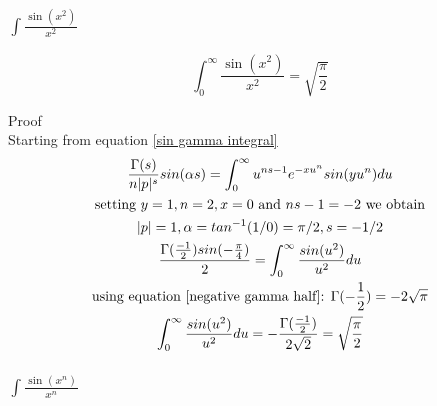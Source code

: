 \documentclass[a4paper]{article}
\begin{document}
\subsubsection{$\int \frac{\sin(x^2)}{x^2}$}

\begin{theorem}
\begin{equation}
\boxed{
\int_{0}^{\infty} \frac{\sin(x^2)}{x^2} = \sqrt{\frac{\pi}{2}}
}
\end{equation}

Proof
\\
Starting from equation \ref{sin gamma integral}
\begin{gather*}
\frac{\Gamma(s)}{n |p|^s} sin(\alpha s)= \int_{0}^{\infty} u^{ns -1} e^{-x u^{n}} sin(y u^n) du
\\
\text{setting $y=1, n=2, x=0$ and $ns -1 = -2$ we obtain}
\\
|p| = 1, \alpha = tan^{-1}(1/0) = \pi/2, s = -1/2
\\
\frac{\Gamma(\frac{-1}{2}) sin(-\frac{\pi}{4})}{2} = \int_{0}^{\infty} \frac{sin(u^2)}{u^2} du
\\
\text{using equation \ref{negative gamma half}: } \Gamma(-\frac{1}{2}) = -2\sqrt{\pi}
\\
\int_{0}^{\infty} \frac{sin(u^2)}{u^2} du = -\frac{\Gamma(\frac{-1}{2})}{2\sqrt{2}} =
\sqrt{\frac{\pi}{2}}
\end{gather*}
\end{theorem}

\subsubsection{$\int \frac{\sin(x^n)}{x^n}$}
\end{document}
